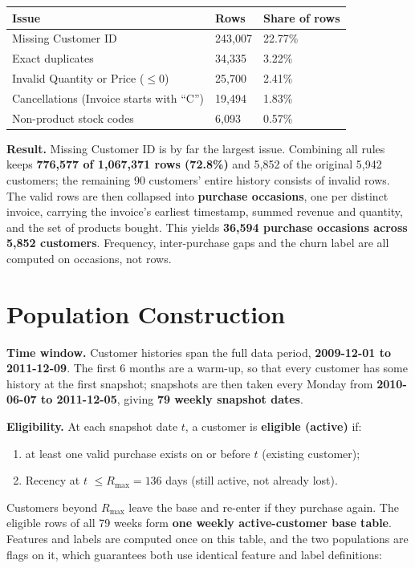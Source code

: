 \begin{center}
\begin{tabular}{@{}p{6cm}p{3.5cm}p{3.5cm}@{}}
    \toprule
    Issue & Rows & Share of rows \\
    \midrule
    Missing Customer ID & 243,007 & 22.77\% \\
    Exact duplicates & 34,335 & 3.22\% \\
    Invalid Quantity or Price ($\leq 0$) & 25,700 & 2.41\% \\
    Cancellations (Invoice starts with ``C'') & 19,494 & 1.83\% \\
    Non-product stock codes & 6,093 & 0.57\% \\
    \bottomrule
\end{tabular}
\end{center}

\textbf{Result.} Missing Customer ID is by far the largest issue. Combining all rules keeps \textbf{776,577 of 1,067,371 rows (72.8\%)} and 5,852 of the original 5,942 customers; the remaining 90 customers' entire history consists of invalid rows. The valid rows are then collapsed into \textbf{purchase occasions}, one per distinct invoice, carrying the invoice's earliest timestamp, summed revenue and quantity, and the set of products bought. This yields \textbf{36,594 purchase occasions across 5,852 customers}. Frequency, inter-purchase gaps and the churn label are all computed on occasions, not rows.

\section{Population Construction}
\label{sec:5-3}

\textbf{Time window.} Customer histories span the full data period, \textbf{2009-12-01 to 2011-12-09}. The first 6 months are a warm-up, so that every customer has some history at the first snapshot; snapshots are then taken every Monday from \textbf{2010-06-07 to 2011-12-05}, giving \textbf{79 weekly snapshot dates}.

\textbf{Eligibility.} At each snapshot date $t$, a customer is \textbf{eligible (active)} if:
\begin{enumerate}
    \item at least one valid purchase exists on or before $t$ (existing customer);
    \item Recency at $t$ $\leq R_{\max} = 136$ days (still active, not already lost).
\end{enumerate}
Customers beyond $R_{\max}$ leave the base and re-enter if they purchase again. The eligible rows of all 79 weeks form \textbf{one weekly active-customer base table}. Features and labels are computed once on this table, and the two populations are flags on it, which guarantees both use identical feature and label definitions:

